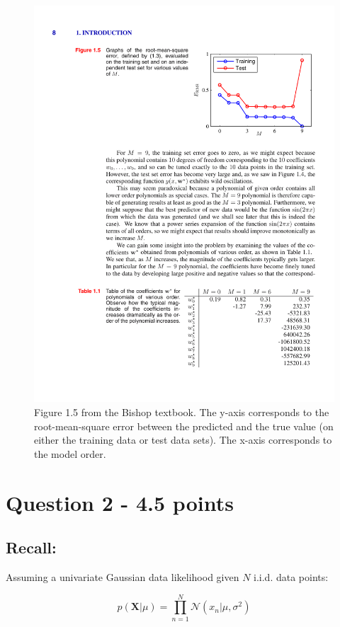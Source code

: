 \documentclass[11pt]{article}
\begin{document}
\begin{figure}[h!]
\centering
\includegraphics{problem1.pdf}
\caption{Figure 1.5 from the Bishop textbook.  The y-axis corresponds to the root-mean-square error between the predicted and the true value (on either the training data or test data sets).  The x-axis corresponds to the model order. }
\end{figure}

\section*{Question 2 - 4.5 points}

\subsection*{Recall:}

Assuming a univariate Gaussian data likelihood given $N$ i.i.d. data points:

\begin{equation}
p(\mathbf{X}|\mu) = \prod^{N}_{n=1}\mathcal{N}(x_n|\mu,\sigma^2)
\end{equation}
\end{document}
